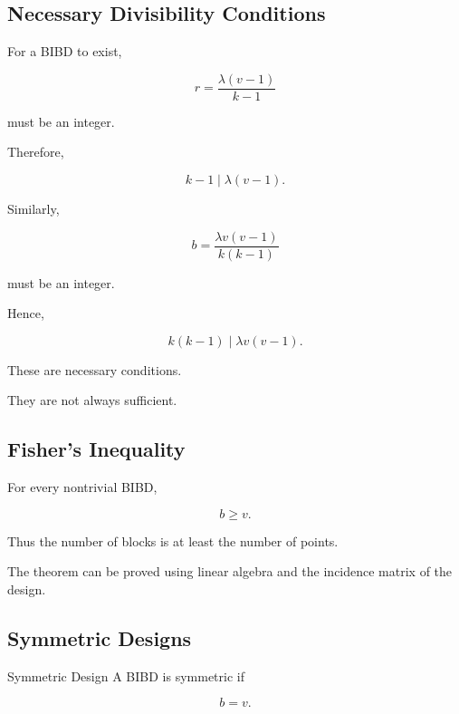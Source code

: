 \subsection{Necessary Divisibility Conditions}
\label{subsec:design-divisibility-conditions}

For a BIBD to exist,

\[
r
=
\frac{\lambda(v-1)}{k-1}
\]

must be an integer.

Therefore,

\[
\boxed{
k-1
\mid
\lambda(v-1).
}
\]

Similarly,

\[
b
=
\frac{\lambda v(v-1)}
{k(k-1)}
\]

must be an integer.

Hence,

\[
\boxed{
k(k-1)
\mid
\lambda v(v-1).
}
\]

These are necessary conditions.

They are not always sufficient.

\subsection{Fisher's Inequality}
\label{subsec:fishers-inequality}

\begin{theorem}
For every nontrivial BIBD,

\[
\boxed{
b\geq v.
}
\]
\end{theorem}

Thus the number of blocks is at least the number of points.

The theorem can be proved using linear algebra and the incidence matrix
of the design.

\subsection{Symmetric Designs}
\label{subsec:symmetric-designs}

\begin{definitionbox}{Symmetric Design}
A BIBD is symmetric if

\[
\boxed{
b=v.
}
\]
\end{definitionbox}

